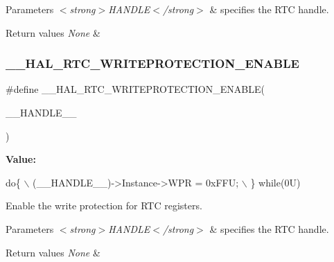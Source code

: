 \begin{DoxyParams}{Parameters}
{\em $<$strong$>$\+H\+A\+N\+D\+L\+E$<$/strong$>$} & specifies the R\+TC handle. \\
\hline
\end{DoxyParams}

\begin{DoxyRetVals}{Return values}
{\em None} & \\
\hline
\end{DoxyRetVals}
\mbox{\label{group___r_t_c___exported___macros_ga9eaed4a4db3b3232c1ca5d8ffa6ff4d8}} 
\subsubsection{\texorpdfstring{\+\_\+\+\_\+\+H\+A\+L\+\_\+\+R\+T\+C\+\_\+\+W\+R\+I\+T\+E\+P\+R\+O\+T\+E\+C\+T\+I\+O\+N\+\_\+\+E\+N\+A\+B\+LE}{\_\_HAL\_RTC\_WRITEPROTECTION\_ENABLE}}
{\footnotesize\ttfamily \#define \+\_\+\+\_\+\+H\+A\+L\+\_\+\+R\+T\+C\+\_\+\+W\+R\+I\+T\+E\+P\+R\+O\+T\+E\+C\+T\+I\+O\+N\+\_\+\+E\+N\+A\+B\+LE(\begin{DoxyParamCaption}\item[{}]{\+\_\+\+\_\+\+H\+A\+N\+D\+L\+E\+\_\+\+\_\+ }\end{DoxyParamCaption})}

{\bfseries Value\+:}
\begin{DoxyCode}
\textcolor{keywordflow}{do}\{                                       \(\backslash\)
                            (\_\_HANDLE\_\_)->Instance->WPR = 0xFFU;  \(\backslash\)
                          \} \textcolor{keywordflow}{while}(0U)
\end{DoxyCode}


Enable the write protection for R\+TC registers. 


\begin{DoxyParams}{Parameters}
{\em $<$strong$>$\+H\+A\+N\+D\+L\+E$<$/strong$>$} & specifies the R\+TC handle. \\
\hline
\end{DoxyParams}

\begin{DoxyRetVals}{Return values}
{\em None} & \\
\hline
\end{DoxyRetVals}
